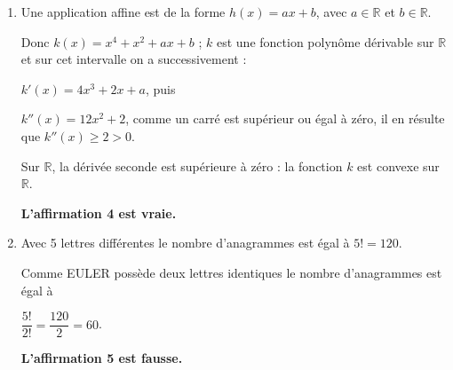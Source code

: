 \documentclass[10pt]{article}
\providecommand{\R}{\mathbb{R}}
\providecommand{\N}{\mathbb{N}}
\begin{document}
\begin{enumerate}
\textit{Conclusion} : La relation est vraie au rang 0 et si elle est vraie au rang $n \in \N$, elle l'est aussi au rang $n + 1$ : d'après le principe de récurrence quel que soit $\begin{gathered}n \in \N, \\\: u_{n+1} < u_n\end{gathered}$ : ceci montre que la suite $(u_n)$ est décroissante.

\hfill\textbf{L'affirmation 3 est vraie.}

\item Une application affine est de la forme $h(x) = ax + b$, avec $a \in \R$ et $b \in \R$.

Donc $k(x) = x^4 + x^2 + ax + b$ ; $k$ est une fonction polynôme dérivable sur $\R$ et sur cet intervalle on a successivement :

$k'(x) = 4x^3 + 2x + a$, puis

$k''(x) = 12x^2 + 2$, comme un carré est supérieur ou égal à zéro, il en résulte que $k''(x) \geqslant 2 > 0$.

Sur $\R$, la dérivée seconde est supérieure à zéro : la fonction $k$ est convexe sur $\R$.

\hfill\textbf{L'affirmation 4 est vraie.}

\item Avec 5 lettres différentes le nombre d'anagrammes est égal à $5! = 120$.

Comme EULER possède deux lettres identiques le nombre d'anagrammes est égal à 

$\dfrac{5!}{2!} = \dfrac{120}{2} = 60$.

\hfill\textbf{L'affirmation 5 est fausse.}
\end{enumerate}
\end{document}
